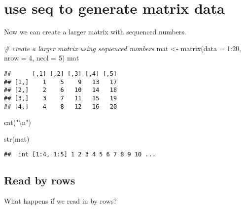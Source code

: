 \documentclass[
]{article}
\newenvironment{Shaded}{\begin{snugshade}}{\end{snugshade}}
\newcommand{\AttributeTok}[1]{\textcolor[rgb]{0.77,0.63,0.00}{#1}}
\newcommand{\CommentTok}[1]{\textcolor[rgb]{0.56,0.35,0.01}{\textit{#1}}}
\newcommand{\DecValTok}[1]{\textcolor[rgb]{0.00,0.00,0.81}{#1}}
\newcommand{\FunctionTok}[1]{\textcolor[rgb]{0.00,0.00,0.00}{#1}}
\newcommand{\NormalTok}[1]{#1}
\newcommand{\OtherTok}[1]{\textcolor[rgb]{0.56,0.35,0.01}{#1}}
\newcommand{\SpecialCharTok}[1]{\textcolor[rgb]{0.00,0.00,0.00}{#1}}
\newcommand{\StringTok}[1]{\textcolor[rgb]{0.31,0.60,0.02}{#1}}
\begin{document}
\hypertarget{use-seq-to-generate-matrix-data}{%
\section{\texorpdfstring{use \textbf{seq} to generate matrix
data}{use seq to generate matrix data}}\label{use-seq-to-generate-matrix-data}}

Now we can create a larger matrix with sequenced numbers.

\begin{Shaded}
\begin{Highlighting}[]
\CommentTok{\# create a larger matrix using sequenced numbers}
\NormalTok{mat }\OtherTok{\textless{}{-}} \FunctionTok{matrix}\NormalTok{(}\AttributeTok{data =} \DecValTok{1}\SpecialCharTok{:}\DecValTok{20}\NormalTok{, }\AttributeTok{nrow =} \DecValTok{4}\NormalTok{, }\AttributeTok{ncol =} \DecValTok{5}\NormalTok{)}
\NormalTok{mat}
\end{Highlighting}
\end{Shaded}

\begin{verbatim}
##      [,1] [,2] [,3] [,4] [,5]
## [1,]    1    5    9   13   17
## [2,]    2    6   10   14   18
## [3,]    3    7   11   15   19
## [4,]    4    8   12   16   20
\end{verbatim}

\begin{Shaded}
\begin{Highlighting}[]
\FunctionTok{cat}\NormalTok{(}\StringTok{"}\SpecialCharTok{\textbackslash{}n}\StringTok{"}\NormalTok{)}
\end{Highlighting}
\end{Shaded}

\begin{Shaded}
\begin{Highlighting}[]
\FunctionTok{str}\NormalTok{(mat)}
\end{Highlighting}
\end{Shaded}

\begin{verbatim}
##  int [1:4, 1:5] 1 2 3 4 5 6 7 8 9 10 ...
\end{verbatim}

\hypertarget{read-by-rows}{%
\subsection{Read by rows}\label{read-by-rows}}

What happens if we read in by rows?
\end{document}
